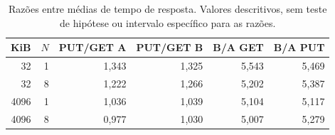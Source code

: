 \begin{table}[htbp]
	\centering
	\caption{Razões entre médias de tempo de resposta. Valores descritivos, sem teste de
		hipótese ou intervalo específico para as razões.}
	\label{tab:comparacoes}
	\begin{tabular}{rrrrrr}
		\toprule
		KiB & $N$ & PUT/GET A & PUT/GET B & B/A GET & B/A PUT \\
		\midrule
		32 & 1 & 1,343 & 1,325 & 5,543 & 5,469 \\
		32 & 8 & 1,222 & 1,266 & 5,202 & 5,387 \\
		4096 & 1 & 1,036 & 1,039 & 5,104 & 5,117 \\
		4096 & 8 & 0,977 & 1,030 & 5,007 & 5,279 \\
		\bottomrule
	\end{tabular}
\end{table}

